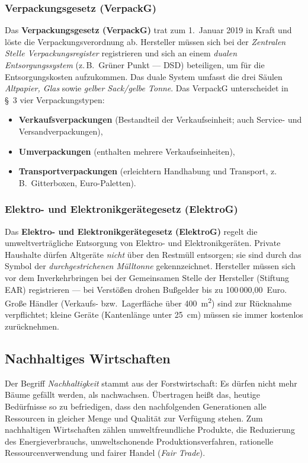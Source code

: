 \documentclass[11pt, a4paper]{article}
\begin{document}
\subsubsection{Verpackungsgesetz (VerpackG)}

Das \textbf{Verpackungsgesetz (VerpackG)} trat zum 1.~Januar 2019 in Kraft und löste die
Verpackungsverordnung ab. Hersteller müssen sich bei der \emph{Zentralen Stelle
Verpackungsregister} registrieren und sich an einem \emph{dualen Entsorgungssystem}
(z.\,B.\ Grüner Punkt --- DSD) beteiligen, um für die Entsorgungskosten aufzukommen.
Das duale System umfasst die drei Säulen \emph{Altpapier, Glas} sowie \emph{gelber
Sack/gelbe Tonne}. Das VerpackG unterscheidet in \S~3 vier Verpackungstypen:

\begin{itemize}
  \item \textbf{Verkaufsverpackungen} (Bestandteil der Verkaufseinheit; auch Service- und Versandverpackungen),
  \item \textbf{Umverpackungen} (enthalten mehrere Verkaufseinheiten),
  \item \textbf{Transportverpackungen} (erleichtern Handhabung und Transport, z.\,B.\ Gitterboxen, Euro-Paletten).
\end{itemize}

\subsubsection{Elektro- und Elektronikgerätegesetz (ElektroG)}

Das \textbf{Elektro- und Elektronikgerätegesetz (ElektroG)} regelt die umweltverträgliche
Entsorgung von Elektro- und Elektronikgeräten. Private Haushalte dürfen Altgeräte
\emph{nicht} über den Restmüll entsorgen; sie sind durch das Symbol der
\emph{durchgestrichenen Mülltonne} gekennzeichnet. Hersteller müssen sich vor dem
Inverkehrbringen bei der \glqq Gemeinsamen Stelle der Hersteller\grqq{} (Stiftung EAR)
registrieren --- bei Verstößen drohen Bußgelder bis zu 100\,000,00~Euro. Große Händler
(Verkaufs- bzw.\ Lagerfläche über 400~m\textsuperscript{2}) sind zur Rücknahme
verpflichtet; kleine Geräte (Kantenlänge unter 25~cm) müssen sie immer kostenlos
zurücknehmen.

\subsection{Nachhaltiges Wirtschaften}

Der Begriff \emph{Nachhaltigkeit} stammt aus der Forstwirtschaft: Es dürfen nicht mehr
Bäume gefällt werden, als nachwachsen. Übertragen heißt das, heutige Bedürfnisse so zu
befriedigen, dass den nachfolgenden Generationen alle Ressourcen in gleicher Menge und
Qualität zur Verfügung stehen. Zum nachhaltigen Wirtschaften zählen umweltfreundliche
Produkte, die Reduzierung des Energieverbrauchs, umweltschonende Produktionsverfahren,
rationelle Ressourcenverwendung und fairer Handel (\emph{Fair Trade}).
\end{document}
